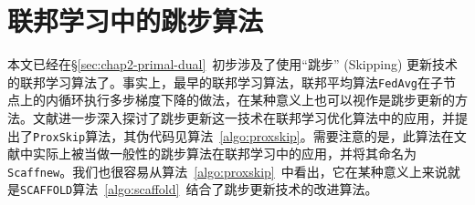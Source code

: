 \section{联邦学习中的跳步算法}
\label{sec:chap2-skip-alg}


本文已经在\S\ref{sec:chap2-primal-dual}~初步涉及了使用``跳步'' (Skipping) 更新技术的联邦学习算法了。事实上，最早的联邦学习算法，联邦平均算法\texttt{FedAvg}\cite{mcmahan2017fed_avg}在子节点上的内循环执行多步梯度下降的做法，在某种意义上也可以视作是跳步更新的方法。文献\cite{proxskip,proxskip-vr}进一步深入探讨了跳步更新这一技术在联邦学习优化算法中的应用，并提出了\texttt{ProxSkip}算法，其伪代码见算法~\ref{algo:proxskip}。需要注意的是，此算法在文献\parencite{proxskip}中实际上被当做一般性的跳步算法在联邦学习中的应用，并将其命名为\texttt{Scaffnew}。我们也很容易从算法~\ref{algo:proxskip}~中看出，它在某种意义上来说就是\texttt{SCAFFOLD}算法~\ref{algo:scaffold}~结合了跳步更新技术的改进算法。



